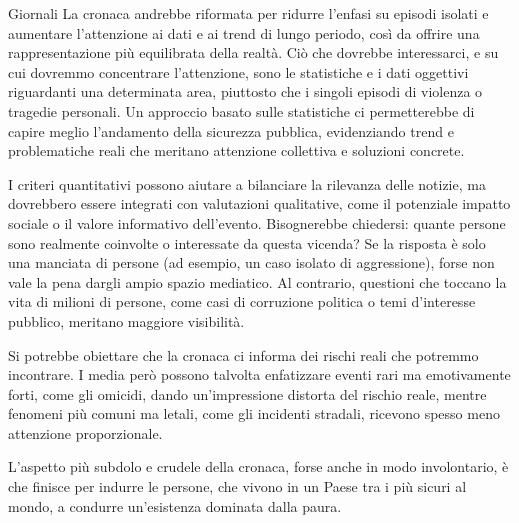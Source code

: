 \documentclass[12pt]{book} %
\begin{document}
\begin{mdframed}[linewidth=1pt]
Giornali
La cronaca andrebbe riformata per ridurre l’enfasi su episodi isolati e aumentare l’attenzione ai dati e ai trend di lungo periodo, così da offrire una rappresentazione più equilibrata della realtà. Ciò che dovrebbe interessarci, e su cui dovremmo concentrare l'attenzione, sono le statistiche e i dati oggettivi riguardanti una determinata area, piuttosto che i singoli episodi di violenza o tragedie personali. Un approccio basato sulle statistiche ci permetterebbe di capire meglio l'andamento della sicurezza pubblica, evidenziando trend e problematiche reali che meritano attenzione collettiva e soluzioni concrete.

I criteri quantitativi possono aiutare a bilanciare la rilevanza delle notizie, ma dovrebbero essere integrati con valutazioni qualitative, come il potenziale impatto sociale o il valore informativo dell’evento. Bisognerebbe chiedersi: quante persone sono realmente coinvolte o interessate da questa vicenda? Se la risposta è solo una manciata di persone (ad esempio, un caso isolato di aggressione), forse non vale la pena dargli ampio spazio mediatico. Al contrario, questioni che toccano la vita di milioni di persone, come casi di corruzione politica o temi d'interesse pubblico, meritano maggiore visibilità.

Si potrebbe obiettare che la cronaca ci informa dei rischi reali che potremmo incontrare. I media però possono talvolta enfatizzare eventi rari ma emotivamente forti, come gli omicidi, dando un’impressione distorta del rischio reale, mentre fenomeni più comuni ma letali, come gli incidenti stradali, ricevono spesso meno attenzione proporzionale.

L’aspetto più subdolo e crudele della cronaca, forse anche in modo involontario, è che finisce per indurre le persone, che vivono in un Paese tra i più sicuri al mondo, a condurre un’esistenza dominata dalla paura.
\end{mdframed}
\end{document}
